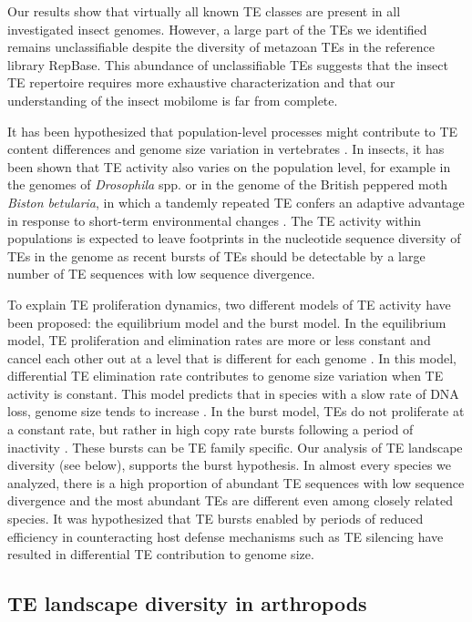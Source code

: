 Our results show that virtually all known TE classes are present in all investigated insect genomes.
However, a large part of the TEs we identified remains unclassifiable despite the diversity of metazoan TEs in the reference library RepBase.
This abundance of unclassifiable TEs suggests that the insect TE repertoire requires more exhaustive characterization and that our understanding of the insect mobilome is far from complete.

It has been hypothesized that population-level processes might
contribute to TE content differences and genome size variation in
vertebrates \citep{Lynch2003}. In insects, it has been shown that TE
activity also varies on the population level, for example in the genomes
of \emph{Drosophila} spp. \citep{Perrat2013,Li2013,Blumenstiel2014} or in the genome of the
British peppered moth \emph{Biston betularia}, in which a tandemly
repeated TE confers an adaptive advantage in response to short-term
environmental changes \citep{Hof2016}. The TE activity within
populations is expected to leave footprints in the nucleotide sequence
diversity of TEs in the genome as recent bursts of TEs should be
detectable by a large number of TE sequences with low sequence
divergence.

To explain TE proliferation dynamics, two different models of TE
activity have been proposed: the equilibrium model and the burst model.
In the equilibrium model, TE proliferation and elimination rates are
more or less constant and cancel each other out at a level that is
different for each genome \citep{Charlesworth1983}. In this model,
differential TE elimination rate contributes to genome size variation
when TE activity is constant. This model predicts that in species with a
slow rate of DNA loss, genome size tends to increase \citep{Petrov2011,Sun2011}.
In the burst model, TEs do not proliferate at a constant rate, but
rather in high copy rate bursts following a period of inactivity
\citep{Blumenstiel2014}. These bursts can be TE family specific. Our analysis
of TE landscape diversity (see below), supports the burst hypothesis. In
almost every species we analyzed, there is a high proportion of abundant
TE sequences with low sequence divergence and the most abundant TEs are
different even among closely related species. It was hypothesized that
TE bursts enabled by periods of reduced efficiency in counteracting host
defense mechanisms such as TE silencing \citep{LeRouzic2006,Rebollo2010} have resulted
in differential TE contribution to genome size.

\subsection{TE landscape diversity in
arthropods}

